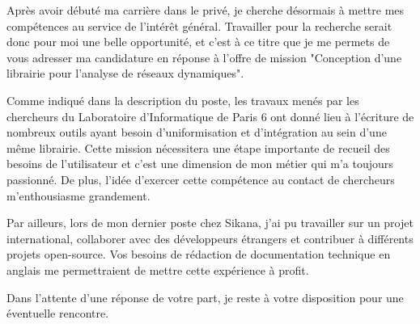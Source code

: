 \documentclass[11pt, a4paper]{awesome-cv}
\begin{document}
\makecvheader

\makelettertitle

\begin{cvletter}
Après avoir débuté ma carrière dans le privé, je cherche désormais à mettre mes compétences au service de l'intérêt général. Travailler pour la recherche serait donc pour moi une belle opportunité, et c'est à ce titre que je me permets de vous adresser ma candidature en réponse à l'offre de mission "Conception d'une librairie pour l'analyse de réseaux dynamiques".

Comme indiqué dans la description du poste, les travaux menés par les chercheurs du Laboratoire d'Informatique de Paris 6 ont donné lieu à l'écriture de nombreux outils ayant besoin d'uniformisation et d'intégration au sein d'une même librairie. Cette mission nécessitera une étape importante de recueil des besoins de l'utilisateur et c'est une dimension de mon métier qui m'a toujours passionné. De plus, l'idée d'exercer cette compétence au contact de chercheurs m'enthousiasme grandement.

Par ailleurs, lors de mon dernier poste chez Sikana, j'ai pu travailler sur un projet international, collaborer avec des développeurs étrangers et contribuer à différents projets open-source. Vos besoins de rédaction de documentation technique en anglais me permettraient de mettre cette expérience à profit.

Dans l'attente d'une réponse de votre part, je reste à votre disposition pour une éventuelle rencontre.
\end{cvletter}

\makeletterclosing
\end{document}
